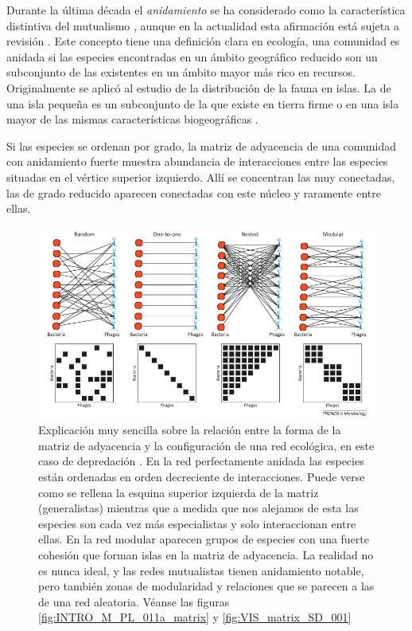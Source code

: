 Durante la última década el \textit{anidamiento} se ha considerado como la característica distintiva del mutualismo \cite{bascompte2003nested}, aunque en la actualidad esta afirmación está sujeta a revisión \cite{james2012disentangling, staniczenko2013ghost, jonhson2013factors, feng2014heterogeneity}. Este concepto tiene una definición clara en ecología, una comunidad es anidada si las especies encontradas en un ámbito geográfico reducido son un subconjunto de las existentes en un ámbito mayor más rico en recursos. Originalmente se aplicó al estudio de la distribución de la fauna en islas. La de una isla pequeña es un subconjunto de la que existe en tierra firme o en una isla mayor de las mismas características biogeográficas \cite{young1958zoogeography, atmar1986nested}.

Si las especies se ordenan por grado, la matriz de adyacencia de una comunidad con anidamiento fuerte muestra abundancia de interacciones entre las especies situadas en el vértice superior izquierdo. Allí se concentran las muy conectadas,
las de grado reducido aparecen conectadas con este núcleo y raramente entre ellas.

\begin{figure}[h!]
\centering
\includegraphics[scale=0.75]{Figures/ESTATICA_redes_ejemplos.png}
\caption{Explicación muy sencilla sobre la relación entre la forma de la matriz de adyacencia y la configuración de una red ecológica, en este caso de depredación \cite{weitz2013phage}. En la red perfectamente anidada las especies están ordenadas en orden decreciente de interacciones. Puede verse como se rellena la esquina superior izquierda de la matriz (generalistas) mientras que a medida que nos alejamos de esta las especies son cada vez más especialistas y solo interaccionan entre ellas. En la red modular aparecen grupos de especies con una fuerte cohesión que forman islas en la matriz de adyacencia. La realidad no es nunca ideal, y las redes mutualistas tienen anidamiento notable, pero también zonas de modularidad y relaciones que se parecen a las de una red aleatoria. Véanse las figuras \ref{fig:INTRO_M_PL_011a_matrix} y \ref{fig:VIS_matrix_SD_001}}
\label{fig:ESTATICA_redes_ejemplos}
\end{figure}


